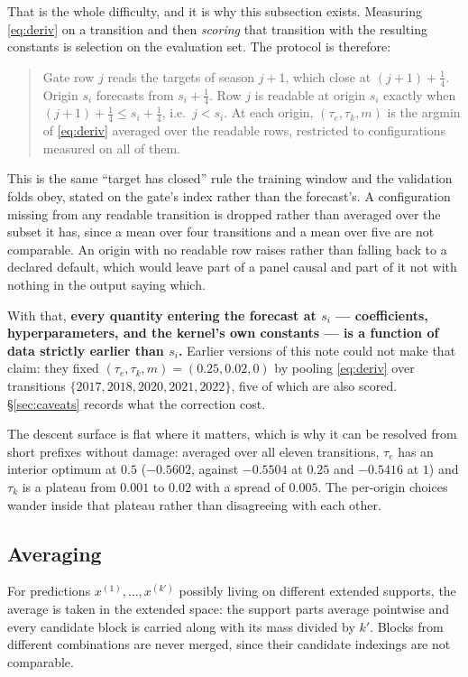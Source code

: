 \documentclass[11pt]{article}
\theoremstyle{remark}
\newcommand{\1}{\mathbf{1}}
\begin{document}
That is the whole difficulty, and it is why this subsection exists. Measuring
\eqref{eq:deriv} on a transition and then \emph{scoring} that transition with the
resulting constants is selection on the evaluation set. The protocol is therefore:

\begin{quote}
Gate row $j$ reads the targets of season $j+1$, which close at $(j+1)+\tfrac14$. Origin
$s_i$ forecasts from $s_i + \tfrac14$. Row $j$ is readable at origin $s_i$ exactly when
$(j+1)+\tfrac14 \le s_i + \tfrac14$, i.e.\ $j < s_i$. At each origin, $(\tau_e, \tau_k, m)$
is the argmin of \eqref{eq:deriv} averaged over the readable rows, restricted to
configurations measured on all of them.
\end{quote}

This is the same ``target has closed'' rule the training window and the validation folds
obey, stated on the gate's index rather than the forecast's. A configuration missing from
any readable transition is dropped rather than averaged over the subset it has, since a
mean over four transitions and a mean over five are not comparable. An origin with no
readable row raises rather than falling back to a declared default, which would leave part
of a panel causal and part of it not with nothing in the output saying which.

\medskip
\noindent
With that, \textbf{every quantity entering the forecast at $s_i$ --- coefficients,
hyperparameters, and the kernel's own constants --- is a function of data strictly earlier
than $s_i$.} Earlier versions of this note could not make that claim: they fixed
$(\tau_e, \tau_k, m) = (0.25, 0.02, 0)$ by pooling \eqref{eq:deriv} over transitions
$\{2017, 2018, 2020, 2021, 2022\}$, five of which are also scored. \S\ref{sec:caveats}
records what the correction cost.

The descent surface is flat where it matters, which is why it can be resolved from short
prefixes without damage: averaged over all eleven transitions, $\tau_e$ has an interior
optimum at $0.5$ ($-0.5602$, against $-0.5504$ at $0.25$ and $-0.5416$ at $1$) and
$\tau_k$ is a plateau from $0.001$ to $0.02$ with a spread of $0.005$. The per-origin
choices wander inside that plateau rather than disagreeing with each other.

\subsection{Averaging}

For predictions $x^{(1)},\dots,x^{(k')}$ possibly living on different extended supports,
the average is taken in the extended space: the support parts average pointwise and every
candidate block is carried along with its mass divided by $k'$. Blocks from different
combinations are never merged, since their candidate indexings are not comparable.
\end{document}
